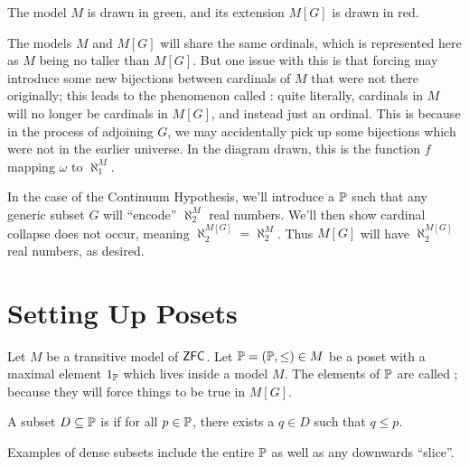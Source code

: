 The model $M$ is drawn in green, and its extension $M[G]$ is drawn in red.

The models $M$ and $M[G]$ will share the same ordinals, which is represented here
as $M$ being no taller than $M[G]$.
But one issue with this is that forcing may introduce some new bijections between cardinals of $M$
that were not there originally; this leads to the phenomenon called :
quite literally, cardinals in $M$ will no longer be cardinals in $M[G]$, and instead just an ordinal.
This is because in the process of adjoining $G$, we may accidentally pick up some bijections which were not in the earlier universe.
In the diagram drawn, this is the function $f$ mapping $\omega$ to $\aleph_1^M$.

In the case of the Continuum Hypothesis, we'll introduce a $\mathbb P$ such that
any generic subset $G$ will ``encode'' $\aleph_2^M$ real numbers.
We'll then show cardinal collapse does not occur, meaning $\aleph_2^{M[G]} = \aleph_2^M$.
Thus $M[G]$ will have $\aleph_2^{M[G]}$ real numbers, as desired.

\section{Setting Up Posets}
Let $M$ be a transitive model of $\mathsf{ZFC}$.
Let $\mathbb P = (\mathbb P, \le) \in M$ be a poset with a maximal element $1_\mathbb P$
which lives inside a model $M$.
The elements of $\mathbb P$ are called ;
because they will force things to be true in $M[G]$.

\begin{definition}
	A subset $D \subseteq \mathbb P$ is  if for all $p \in \mathbb P$,
	there exists a $q  \in D$ such that $q \le p$.
\end{definition}
Examples of dense subsets include the entire $\mathbb P$ as well
as any downwards ``slice''.

